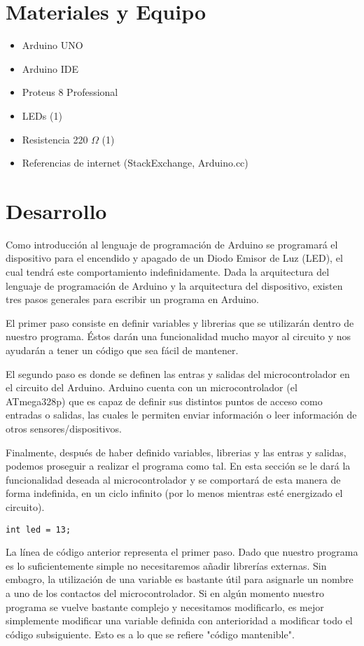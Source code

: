 \documentclass[12pt, letterpaper]{article}
\begin{document}
\section*{Materiales y Equipo}
\begin{itemize}
	\item Arduino UNO
	\item Arduino IDE
	\item Proteus 8 Professional
	\item LEDs (1)
	\item Resistencia 220 $\Omega$ (1)
	\item Referencias de internet (StackExchange, Arduino.cc)
\end{itemize}

\section*{Desarrollo}

Como introducción al lenguaje de programación de Arduino se programará el dispositivo para el encendido y apagado de un Diodo Emisor de Luz (LED), el cual tendrá este comportamiento indefinidamente. Dada la arquitectura del lenguaje de programación de Arduino y la arquitectura del dispositivo, existen tres pasos generales para escribir un programa en Arduino.

El primer paso consiste en definir variables y librerias que se utilizarán dentro de nuestro programa. Éstos darán una funcionalidad mucho mayor al circuito y nos ayudarán a tener un código que sea fácil de mantener.

El segundo paso es donde se definen las entras y salidas del microcontrolador en el circuito del Arduino. Arduino cuenta con un microcontrolador (el ATmega328p) que es capaz de definir sus distintos puntos de acceso como entradas o salidas, las cuales le permiten enviar información o leer información de otros sensores/dispositivos.

Finalmente, después de haber definido variables, librerias y las entras y salidas, podemos proseguir a realizar el programa como tal. En esta sección se le dará la funcionalidad deseada al microcontrolador y se comportará de esta manera de forma indefinida, en un ciclo infinito (por lo menos mientras esté energizado el circuito).

\begin{lstlisting}[language=Arduino]
	int led = 13;
\end{lstlisting}

La línea de código anterior representa el primer paso. Dado que nuestro programa es lo suficientemente simple no necesitaremos añadir librerías externas. Sin embagro, la utilización de una variable es bastante útil para asignarle un nombre a uno de los contactos del microcontrolador. Si en algún momento nuestro programa se vuelve bastante complejo y necesitamos modificarlo, es mejor simplemente modificar una variable definida con anterioridad a modificar todo el código subsiguiente. Esto es a lo que se refiere "código mantenible".
\end{document}
